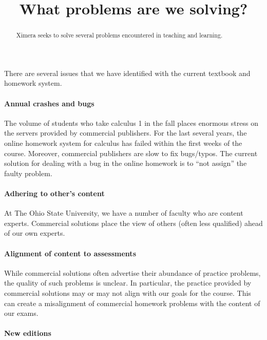 \documentclass{ximera}
\title{What problems are we solving?}
\begin{document}
\begin{abstract}
  Ximera seeks to solve several problems encountered in teaching and
  learning.
\end{abstract}
\maketitle

There are several issues that we have identified with the current
textbook and homework system.

\paragraph{Annual crashes and bugs}

The volume of students who take calculus 1 in the fall places enormous
stress on the servers provided by commercial publishers. For the last
several years, the online homework system for calculus has failed
within the first weeks of the course.  Moreover, commercial publishers
are slow to fix bugs/typos. The current solution for dealing with a
bug in the online homework is to ``not assign'' the faulty problem.

\paragraph{Adhering to other's content}

At The Ohio State University, we have a number of faculty who are
content experts. Commercial solutions place the view of others (often
less qualified) ahead of our own experts. 


\paragraph{Alignment of content to assessments}

While commercial solutions often advertise their abundance of practice
problems, the quality of such problems is unclear. In particular, the
practice provided by commercial solutions may or may not align with
our goals for the course. This can create a misalignment of commercial
homework problems with the content of our exams.


\paragraph{New editions}
\end{document}
